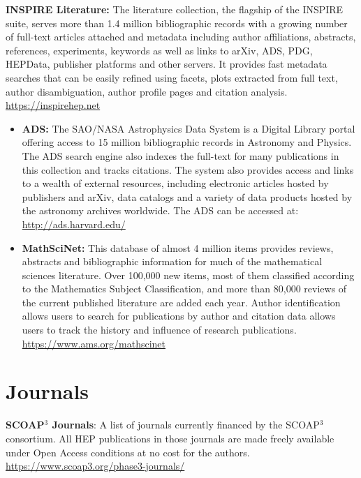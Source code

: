 \item
  \textbf{INSPIRE Literature:} The literature collection, the flagship of the
  INSPIRE suite, serves more than 1.4 million bibliographic records with a
  growing number of full-text articles attached and metadata including author
  affiliations, abstracts, references, experiments, keywords as well as links
  to arXiv, ADS, PDG, HEPData, publisher platforms and other servers. It
  provides fast metadata searches that can be easily refined using facets,
  plots extracted from full text, author disambiguation, author profile pages
  and citation analysis.
  \url{https://inspirehep.net}

\begin{itemize}
\item
  \textbf{ADS:} The SAO/NASA Astrophysics Data System is a Digital
  Library portal offering access to 15 million bibliographic records in
  Astronomy and Physics. The ADS search engine also indexes the
  full-text for many publications in this
  collection and tracks citations. The system also provides access and links to a wealth of
  external resources, including electronic articles hosted by publishers
  and arXiv, data catalogs and a variety of data products hosted by the
  astronomy archives worldwide. The ADS can be accessed at:
  \url{http://ads.harvard.edu/}

\item
  \textbf{MathSciNet:} This database of almost 4 million items provides
  reviews, abstracts and bibliographic information for much of the
  mathematical sciences literature. Over 100,000 new items, most of them
  classified according to the Mathematics Subject Classification, and
  more than 80,000 reviews of the current published literature are added
  each year. Author identification allows users to search for
  publications by author and citation data allows users to track the
  history and influence of research publications.
  \url{https://www.ams.org/mathscinet}
\end{itemize}

\section{Journals}\label{databases:sec:journals}
\textbf{SCOAP$^3$ Journals}: A list of journals currently financed by the SCOAP$^3$ consortium. All HEP publications in those journals are made freely available under Open Access conditions at no cost for the authors. \url{https://www.scoap3.org/phase3-journals/}

